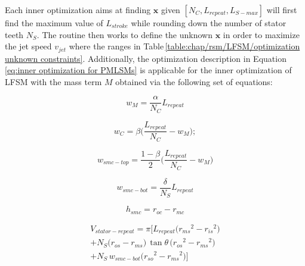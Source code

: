                 
                Each inner optimization aims at finding $\textbf{x}$ given $[N_C, L_{repeat}, L_{S-max}]$ will first find the maximum value of $L_{stroke}$ while rounding down the number of stator teeth $N_S$. The routine then works to define the unknown $\textbf{x}$ in order to maximize the jet speed $v_{jet}$ where the ranges in Table\,\ref{table:chap/rsm/LFSM/optimization unknown constraints}. Additionally, the optimization description in Equation\,\ref{eq:inner optimization for PMLSMs} is applicable for the inner optimization of \acs{LFSM} with the mass term $M$ obtained via the following set of equations:
                
                
                \begin{equation}
                    w_M = \frac{\alpha}{N_C} L_{repeat}
                    \label{eq:rsm/LFSM/w_m}
                \end{equation}
                
                
                \begin{equation}
                    w_C = \beta\bigg(\frac{L_{repeat}}{N_C}-w_M\bigg);
                    \label{eq:rsm/LFSM/w_c}
                \end{equation}
                
                
                \begin{equation}
                    w_{smc-top} = \frac{1-\beta}{2}\bigg(\frac{L_{repeat}}{N_C}-w_M\bigg)
                    \label{eq:rsm/LFSM/w_smc_top}
                \end{equation}
                
                
                \begin{equation}
                    w_{smc-bot} =  \frac{\delta }{N_S}L_{repeat}
                    \label{eq:rsm/LFSM/w_smc_bot}
                \end{equation}
                
                
                \begin{equation}
                    h_{smc} = r_{oc} - r_{mc}
                    \label{eq:rsm/LFSM/h_smc}
                \end{equation}
                
                
                \begin{equation}
                    \begin{array}{c}
                        V_{stator-repeat} = \pi \bigg[  L_{repeat}  \big({r_{ms}}^2-{r_{is}}^2\big)\\
                        + N_S  \big(r_{os}-r_{ms}\big)\,\tan{\theta}\,\big({r_{os}}^2-{r_{ms}}^2\big)\\
                        + N_S\,w_{smc-bot}\big( {r_{so}}^2 - {r_{ms}}^2 \big)\bigg]
                    \end{array}
                    \label{eq:rsm/LFSM/V_stator_repeat}
                \end{equation}
                
